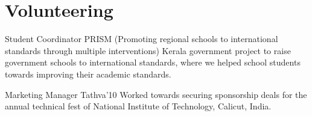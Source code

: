 \documentclass[11pt,a4paper,sans]{moderncv}
\begin{document}

\section{Volunteering}

            {Student Coordinator}
            {
                PRISM (Promoting regional schools to international standards
                through multiple interventions)
            }
            {}
            {}
            {
                Kerala government project to raise government schools to
                international standards, where we helped school students towards
                improving their academic standards.
            }

            {Marketing Manager}
            {Tathva'10}
            {}
            {}
            {
                Worked towards securing sponsorship deals for the annual
                technical fest of National Institute of Technology, Calicut,
                India.
            }


%


%

\end{document}
